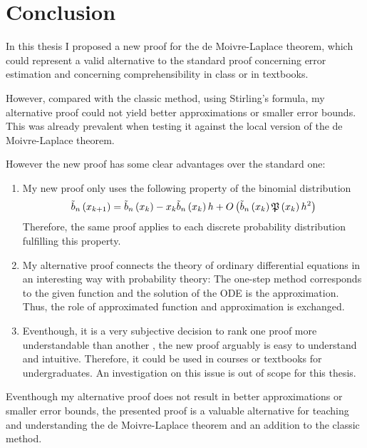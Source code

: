 \chapter{Conclusion}

In this thesis I proposed a new proof for the de Moivre-Laplace theorem, which could represent a valid alternative to the standard proof concerning error estimation and concerning comprehensibility in class or in textbooks. 

However, compared with the classic method, using Stirling’s formula, my alternative proof could not yield better approximations or smaller error bounds. This was already prevalent when testing it against the local version of the de Moivre-Laplace theorem.

However the new proof has some clear advantages over the standard one:

\begin{enumerate}
  \item My new proof only uses the following property of the binomial distribution
    \begin{align}
      \bb{\x[k+1]} = \bb{\x[k]} - \x[k]\bb{\x[k]} h + \bigo{\bb{\x[k]} \pol{\x[k]} h^2}
    \end{align}
    Therefore, the same proof applies to each discrete probability distribution fulfilling this property.

  \item My alternative proof connects the theory of ordinary differential equations in an interesting way with probability theory: The one-step method corresponds to the given function and the solution of the ODE is the approximation. Thus, the role of approximated function and approximation is exchanged.

  \item Eventhough, it is a very subjective decision to rank one proof more understandable than another \cite{tampis:understandability}, the new proof arguably is easy to understand and intuitive. Therefore, it could be used in courses or textbooks for undergraduates. An investigation on this issue is out of scope for this thesis.
\end{enumerate}

Eventhough my alternative proof does not result in better approximations or smaller error bounds, the presented proof is a valuable alternative for teaching and understanding the de Moivre-Laplace theorem and an addition to the classic method. 
